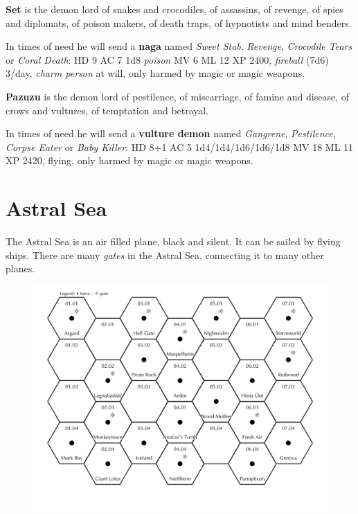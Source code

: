 \documentclass[11pt]{bxart}
\begin{document}
\textbf{Set} is the demon lord of snakes and crocodiles, of assassins, of revenge, of spies and diplomats, of poison makers, of death traps, of hypnotists and mind benders.

In times of need he will send a \textbf{naga} named \textit{Sweet Stab}, \textit{Revenge}, \textit{Crocodile Tears} or \textit{Coral Death}: HD 9 AC 7 1d8 \textit{poison} MV 6 ML 12 XP 2400, \textit{fireball} (7d6) 3/day, \textit{charm person} at will, only harmed by magic or magic weapons.

\textbf{Pazuzu} is the demon lord of pestilence, of miscarriage, of famine and disease, of crows and vultures, of temptation and betrayal.

In times of need he will send a \textbf{vulture demon} named \textit{Gangrene}, \textit{Pestilence}, \textit{Corpse Eater} or \textit{Baby Killer}: HD 8+1 AC 5 1d4/1d4/1d6/1d6/1d8 MV 18 ML 11 XP 2420, flying, only harmed by magic or magic weapons.

\section{Astral Sea}

The Astral Sea is an air filled plane, black and silent. It can be sailed by flying ships. There are many \textit{gates} in the Astral Sea, connecting it to many other planes.

\begin{figure}
  \centering
  \includegraphics[width=15cm]{Astral-Sea.png}
\end{figure}
\end{document}
